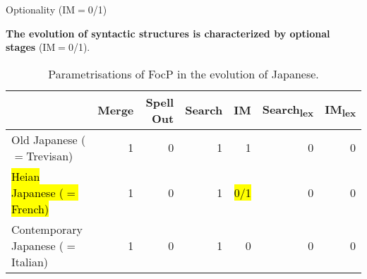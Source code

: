 \documentclass[lesson_slides]{subfiles}
\begin{document}
\begin{frame}[c]{Optionality (IM$=$0/1)}

\textbf{The evolution of syntactic structures is characterized by optional stages} (IM$=$0/1).

\begin{table}[ht]
    \centering
    \begin{tabular}{|l|r|r|r|r|r|r|}
    \hline
     & Merge & Spell Out & Search & IM & Search\textsubscript{lex} & IM\textsubscript{lex} \\
    \hline
    Old Japanese ($=$Trevisan) & 1 & 0 & 1 & 1 & 0 & 0\\
    \hline
    \hl{Heian Japanese ($=$French)} & 1 & 0 & 1 & \hl{0/1} & 0 & 0 \\
    \hline
    Contemporary Japanese ($=$Italian) & 1 & 0 & 1 & 0 & 0 & 0 \\
    \hline
    \end{tabular}
    \caption{\label{tab:samp2}Parametrisations of FocP in the evolution of Japanese.}
    \end{table}

\end{frame}



\end{document}
